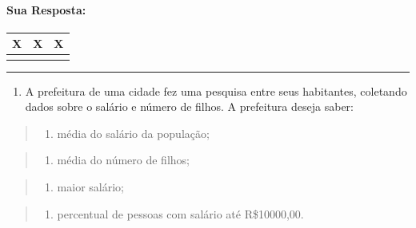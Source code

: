\documentclass[12pt,a4paper]{article}
\providecommand{\tightlist}{%
      \setlength{\itemsep}{0pt}\setlength{\parskip}{0pt}}
\begin{document}
    \hypertarget{sua-resposta}{%
\paragraph{Sua Resposta:}\label{sua-resposta}}

\begin{longtable}[]{@{}ccc@{}}
\toprule
X & X & X\tabularnewline
\midrule
\endhead
& &\tabularnewline
\bottomrule
\end{longtable}

    \begin{center}\rule{0.5\linewidth}{0.5pt}\end{center}

\begin{enumerate}
\def\labelenumi{\arabic{enumi}.}
\setcounter{enumi}{4}
\tightlist
\item
  A prefeitura de uma cidade fez uma pesquisa entre seus habitantes,
  coletando dados sobre o salário e número de filhos. A prefeitura
  deseja saber:
\end{enumerate}

\begin{quote}
\begin{enumerate}
\def\labelenumi{\alph{enumi})}
\tightlist
\item
  média do salário da população;
\end{enumerate}
\end{quote}

\begin{quote}
\begin{enumerate}
\def\labelenumi{\alph{enumi})}
\setcounter{enumi}{1}
\tightlist
\item
  média do número de filhos;
\end{enumerate}
\end{quote}

\begin{quote}
\begin{enumerate}
\def\labelenumi{\alph{enumi})}
\setcounter{enumi}{2}
\tightlist
\item
  maior salário;
\end{enumerate}
\end{quote}

\begin{quote}
\begin{enumerate}
\def\labelenumi{\alph{enumi})}
\setcounter{enumi}{3}
\tightlist
\item
  percentual de pessoas com salário até R\$10000,00.
\end{enumerate}
\end{quote}
\end{document}
